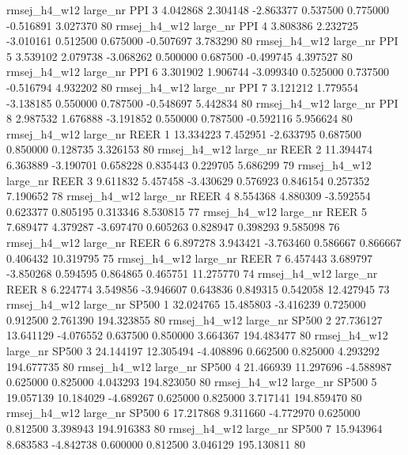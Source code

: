 rmsej_h4_w12   large_nr      PPI                 3  4.042868  2.304148  -2.863377 0.537500 0.775000 -0.516891    3.027370 80
rmsej_h4_w12   large_nr      PPI                 4  3.808386  2.232725  -3.010161 0.512500 0.675000 -0.507697    3.783290 80
rmsej_h4_w12   large_nr      PPI                 5  3.539102  2.079738  -3.068262 0.500000 0.687500 -0.499745    4.397527 80
rmsej_h4_w12   large_nr      PPI                 6  3.301902  1.906744  -3.099340 0.525000 0.737500 -0.516794    4.932202 80
rmsej_h4_w12   large_nr      PPI                 7  3.121212  1.779554  -3.138185 0.550000 0.787500 -0.548697    5.442834 80
rmsej_h4_w12   large_nr      PPI                 8  2.987532  1.676888  -3.191852 0.550000 0.787500 -0.592116    5.956624 80
rmsej_h4_w12   large_nr     REER                 1 13.334223  7.452951  -2.633795 0.687500 0.850000  0.128735    3.326153 80
rmsej_h4_w12   large_nr     REER                 2 11.394474  6.363889  -3.190701 0.658228 0.835443  0.229705    5.686299 79
rmsej_h4_w12   large_nr     REER                 3  9.611832  5.457458  -3.430629 0.576923 0.846154  0.257352    7.190652 78
rmsej_h4_w12   large_nr     REER                 4  8.554368  4.880309  -3.592554 0.623377 0.805195  0.313346    8.530815 77
rmsej_h4_w12   large_nr     REER                 5  7.689477  4.379287  -3.697470 0.605263 0.828947  0.398293    9.585098 76
rmsej_h4_w12   large_nr     REER                 6  6.897278  3.943421  -3.763460 0.586667 0.866667  0.406432   10.319795 75
rmsej_h4_w12   large_nr     REER                 7  6.457443  3.689797  -3.850268 0.594595 0.864865  0.465751   11.275770 74
rmsej_h4_w12   large_nr     REER                 8  6.224774  3.549856  -3.946607 0.643836 0.849315  0.542058   12.427945 73
rmsej_h4_w12   large_nr    SP500                 1 32.024765 15.485803  -3.416239 0.725000 0.912500  2.761390  194.323855 80
rmsej_h4_w12   large_nr    SP500                 2 27.736127 13.641129  -4.076552 0.637500 0.850000  3.664367  194.483477 80
rmsej_h4_w12   large_nr    SP500                 3 24.144197 12.305494  -4.408896 0.662500 0.825000  4.293292  194.677735 80
rmsej_h4_w12   large_nr    SP500                 4 21.466939 11.297696  -4.588987 0.625000 0.825000  4.043293  194.823050 80
rmsej_h4_w12   large_nr    SP500                 5 19.057139 10.184029  -4.689267 0.625000 0.825000  3.717141  194.859470 80
rmsej_h4_w12   large_nr    SP500                 6 17.217868  9.311660  -4.772970 0.625000 0.812500  3.398943  194.916383 80
rmsej_h4_w12   large_nr    SP500                 7 15.943964  8.683583  -4.842738 0.600000 0.812500  3.046129  195.130811 80

